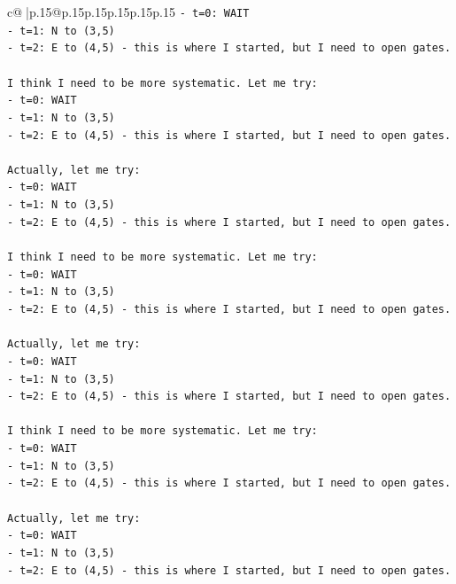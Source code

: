 \documentclass{article}
\begin{document}
{\begin{supertabular}{c@{$\;$}|p{.15\linewidth}@{}p{.15\linewidth}p{.15\linewidth}p{.15\linewidth}p{.15\linewidth}p{.15\linewidth}}
{{{\texttt{{-} t=0: WAIT} \\
\texttt{{-} t=1: N to (3,5)} \\
\texttt{{-} t=2: E to (4,5) {-} this is where I started, but I need to open gates.} \\
\\ 
\texttt{I think I need to be more systematic. Let me try:} \\
\texttt{{-} t=0: WAIT} \\
\texttt{{-} t=1: N to (3,5)} \\
\texttt{{-} t=2: E to (4,5) {-} this is where I started, but I need to open gates.} \\
\\ 
\texttt{Actually, let me try:} \\
\texttt{{-} t=0: WAIT} \\
\texttt{{-} t=1: N to (3,5)} \\
\texttt{{-} t=2: E to (4,5) {-} this is where I started, but I need to open gates.} \\
\\ 
\texttt{I think I need to be more systematic. Let me try:} \\
\texttt{{-} t=0: WAIT} \\
\texttt{{-} t=1: N to (3,5)} \\
\texttt{{-} t=2: E to (4,5) {-} this is where I started, but I need to open gates.} \\
\\ 
\texttt{Actually, let me try:} \\
\texttt{{-} t=0: WAIT} \\
\texttt{{-} t=1: N to (3,5)} \\
\texttt{{-} t=2: E to (4,5) {-} this is where I started, but I need to open gates.} \\
\\ 
\texttt{I think I need to be more systematic. Let me try:} \\
\texttt{{-} t=0: WAIT} \\
\texttt{{-} t=1: N to (3,5)} \\
\texttt{{-} t=2: E to (4,5) {-} this is where I started, but I need to open gates.} \\
\\ 
\texttt{Actually, let me try:} \\
\texttt{{-} t=0: WAIT} \\
\texttt{{-} t=1: N to (3,5)} \\
\texttt{{-} t=2: E to (4,5) {-} this is where I started, but I need to open gates.} \\
}}}
\end{supertabular}}
\end{document}

